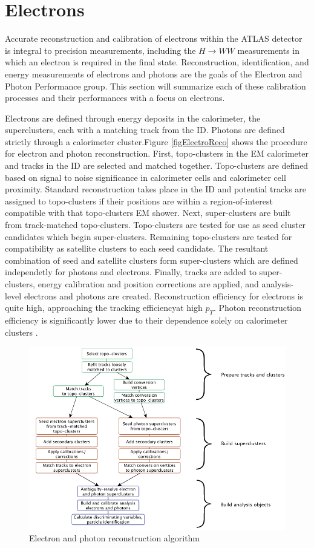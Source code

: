 \section{Electrons}
Accurate reconstruction and calibration of electrons within the ATLAS detector is integral to precision measurements, including the $H\rightarrow WW$ measurements in which an electron is required in the final state. Reconstruction, identification, and energy measurements of electrons and photons are the goals of the Electron and Photon Performance group.  This section will summarize each of these calibration processes and their performances with a focus on electrons. 

Electrons are defined through energy deposits in the calorimeter, the superclusters, each with a matching track from the ID. Photons are defined strictly through a calorimeter cluster.Figure \ref{figElectroReco} shows the procedure for electron and photon reconstruction. First, topo-clusters in the EM calorimeter and tracks in the ID are selected and matched together. Topo-clusters are defined based on signal to noise significance in calorimeter cells and calorimeter cell proximity. Standard reconstruction takes place in the ID and potential tracks are assigned to topo-clusters if their positions are within a region-of-interest compatible with that topo-clusters EM shower. Next, super-clusters are built from track-matched topo-clusters. Topo-clusters are tested for use as seed cluster candidates which begin super-clusters. Remaining topo-clusters are tested for compatibility as satellite clusters to each seed candidate. The resultant combination of seed and satellite clusters form super-clusters which are defined independetly for photons and electrons.  Finally, tracks are added to super-clusters, energy calibration and position corrections are applied, and analysis-level electrons and photons are created. Reconstruction efficiency for electrons is quite high, approaching the tracking efficiencyat high $p_T$. Photon reconstruction efficiency is significantly lower due to their dependence solely on calorimeter clusters \cite{ElectronPhotonPerformance}. 

\begin{figure}[!h]
        \centering
    \includegraphics[width=.6\textwidth]{Pictures/ElectroReco.png}
    \caption{ Electron and photon reconstruction algorithm \cite{ElectronPhotonPerformance}}
    \label{fig:ElectroReco}
\end{figure}
 
